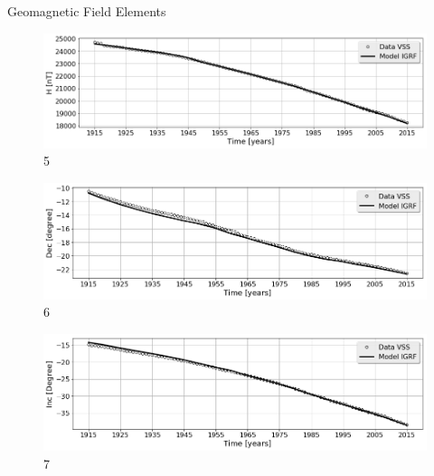 \documentclass[final,t]{beamer}
\begin{document}
\begin{columns}[t]
\begin{column}{.66\linewidth}
\begin{columns}
\begin{column}{.31\linewidth}
\begin{block}{Geomagnetic Field Elements}
\begin{figure}
	\centering
	\includegraphics[scale=0.5]{"figs_ed/H mean all_v3"}
	\caption{5}
	\label{fig:Hmeanall_v2}
\end{figure}


\begin{figure}
\centering
\includegraphics[scale=0.5]{"figs_ed/D mean all_v3"}
\caption{6}
\label{fig:Dmeanall_v2}
\end{figure}


\begin{figure}
\centering
\includegraphics[scale=0.5]{"figs_ed/I mean all_v3"}
\caption{7}
\label{fig:Imeanall_v2}
\end{figure}


	
	
\end{block}




\end{column}
\end{columns}
\end{column}
\end{columns}
\end{document}
